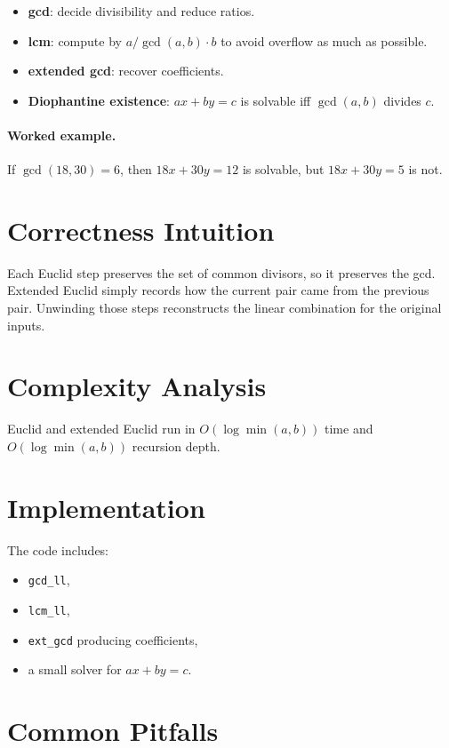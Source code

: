 \begin{itemize}
  \item \textbf{gcd}: decide divisibility and reduce ratios.
  \item \textbf{lcm}: compute by \(a / \gcd(a,b) \cdot b\) to avoid overflow as much as possible.
  \item \textbf{extended gcd}: recover coefficients.
  \item \textbf{Diophantine existence}: \(ax + by = c\) is solvable iff \(\gcd(a,b)\) divides \(c\).
\end{itemize}

\paragraph{Worked example.}
If \(\gcd(18, 30) = 6\), then \(18x + 30y = 12\) is solvable, but \(18x + 30y = 5\) is not.

\section*{Correctness Intuition}

Each Euclid step preserves the set of common divisors, so it preserves the gcd. Extended Euclid simply records how the
current pair came from the previous pair. Unwinding those steps reconstructs the linear combination for the original
inputs.

\section*{Complexity Analysis}

Euclid and extended Euclid run in \(O(\log \min(a, b))\) time and \(O(\log \min(a, b))\) recursion depth.

\section*{Implementation}

The code includes:

\begin{itemize}
  \item \texttt{gcd\_ll},
  \item \texttt{lcm\_ll},
  \item \texttt{ext\_gcd} producing coefficients,
  \item a small solver for \(ax + by = c\).
\end{itemize}

\section*{Common Pitfalls}

